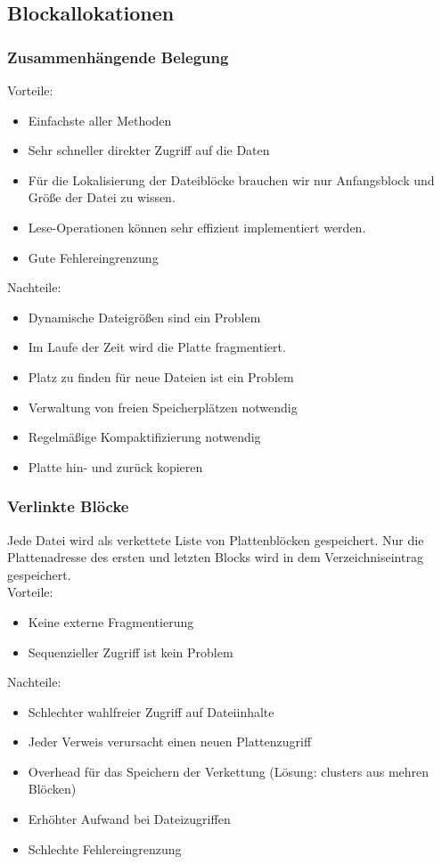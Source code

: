 \documentclass[a4paper, 10pt]{article}
\begin{document}
\subsection{Blockallokationen}
\subsubsection{Zusammenh\"angende Belegung}
Vorteile:
\begin{itemize}
\item Einfachste aller Methoden
\item Sehr schneller direkter Zugriff auf die Daten
\item F\"ur die Lokalisierung der Dateibl\"ocke brauchen wir
nur Anfangsblock und Gr\"oße der Datei zu wissen.
\item Lese-Operationen k\"onnen sehr effizient implementiert
werden.
\item Gute Fehlereingrenzung
\end{itemize}
Nachteile:
\begin{itemize}
\item Dynamische Dateigr\"oßen sind ein Problem
\item Im Laufe der Zeit wird die Platte fragmentiert.
\item Platz zu finden f\"ur neue Dateien ist ein Problem
\item Verwaltung von freien Speicherpl\"atzen notwendig
\item Regelm\"aßige Kompaktifizierung notwendig
\item Platte hin- und zur\"uck kopieren
\end{itemize}
\subsubsection{Verlinkte Bl\"ocke}
Jede Datei wird als verkettete Liste von Plattenbl\"ocken gespeichert. Nur die Plattenadresse des ersten und letzten Blocks wird in dem Verzeichniseintrag gespeichert.\\
Vorteile:
\begin{itemize}
\item Keine externe Fragmentierung
\item Sequenzieller Zugriff ist kein Problem
\end{itemize}
Nachteile:
\begin{itemize}
\item Schlechter wahlfreier Zugriff auf Dateiinhalte
\item Jeder Verweis verursacht einen neuen Plattenzugriff
\item Overhead f\"ur das Speichern der Verkettung (L\"osung: clusters aus mehren Bl\"ocken)
\item Erh\"ohter Aufwand bei Dateizugriffen
\item Schlechte Fehlereingrenzung
\end{itemize}
\end{document}
